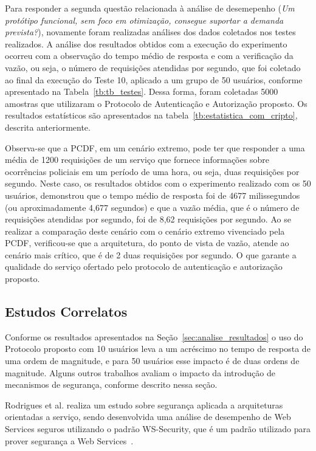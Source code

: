 

Para responder a segunda questão relacionada \`{a} an\'{a}lise de desemepenho (\emph{Um protótipo funcional, sem foco em otimização, consegue suportar a demanda prevista?}), novamente foram realizadas análises dos dados coletados nos testes realizados. A análise dos resultados obtidos com a execução do experimento ocorreu com a observação do tempo médio de resposta e com a verificação da vazão, ou seja, o número de requisições atendidas por segundo, que foi coletado ao final da execução do Teste 10, aplicado a um grupo de 50 usuários, conforme apresentado na Tabela~\ref{tb:tb_testes}. Dessa forma, foram coletadas 5000 amostras que utilizaram o Protocolo de Autenticação e Autorização proposto. Os resultados estatísticos são apresentados na tabela~\ref{tb:estatistica_com_cripto}, descrita anteriormente.

Observa-se que a PCDF, em um cenário extremo, pode ter que responder a uma média de 1200 requisições de um serviço que fornece informações sobre ocorrências policiais em um período de uma hora, ou seja, duas requisições por segundo. Neste caso, os resultados obtidos com o experimento realizado com os 50 usuários, demonstrou que o tempo médio de resposta foi de 4677 milissegundos (ou aproximadamente 4,677 segundos) e que a vazão média, que é o número de requisições atendidas por segundo, foi de 8,62 requisições por segundo. Ao se realizar a comparação deste cenário com o cenário extremo vivenciado pela PCDF, verificou-se que a arquitetura, do ponto de vista de vazão, atende ao cen\'{a}rio mais cr\'{i}tico, que é de 2 duas requisições por segundo. O que garante a qualidade do serviço ofertado pelo protocolo de autenticação e autorização proposto.

\subsection{Estudos Correlatos}

Conforme os resultados apresentados na Seção~\ref{sec:analise_resultados} o uso do Protocolo proposto com 10 usuários leva a um acréscimo no tempo de resposta de uma ordem de magnitude, e para 50 usuários esse impacto é de duas ordens de magnitude. Alguns outros trabalhos avaliam o impacto da introdução de mecanismos de segurança, conforme descrito nessa seção.

Rodrigues et al. realiza um estudo sobre segurança aplicada a arquiteturas orientadas a serviço, sendo desenvolvida uma análise de desempenho de Web Services seguros utilizando o padrão WS-Security, que é um padrão utilizado para prover segurança a Web Services~\cite{rodrigues2011analysis}.

